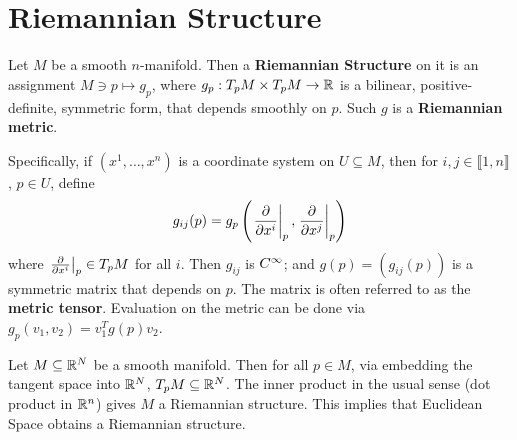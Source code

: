 \documentclass{article}
\begin{document}

\tableofcontents
\newpage

\section{Riemannian Structure}

\begin{definition}
    Let $M$ be a smooth $n$-manifold. Then a \textbf{Riemannian Structure} on it is an assignment $M \ni p \mapsto g_p$, where $g_p: T_p M \times T_p M \to \mathbb{R}$ is a bilinear, positive-definite, symmetric form, that depends smoothly on $p$. Such $g$ is a \textbf{Riemannian metric}. 
    
    Specifically, if $(x^1, \dots, x^n)$ is a coordinate system on $U \subseteq M$, then for $i, j \in \llbracket 1, n \rrbracket$, $p \in U$, define
    \[
        g_{ij}(p) = g_p\left(\left.\frac{\partial }{\partial x^i}\right|_{p}, \left.\frac{\partial }{\partial x^j}\right|_{p}\right)
    \]
    where $\left.\frac{\partial }{\partial x^i}\right|_{p} \in T_p M$ for all $i$. Then $g_{ij}$ is $C^{\infty}$; and $g(p) = (g_{ij}(p))$ is a symmetric matrix that depends on $p$. The matrix is often referred to as the \textbf{metric tensor}. Evaluation on the metric can be done via $g_p(v_1, v_2) = v_1^T g(p) v_2$.
\end{definition}

\begin{example}
    Let $M \subseteq \mathbb{R}^N$ be a smooth manifold. Then for all $p \in M$, via embedding the tangent space into $\mathbb{R}^N$, $T_p M \subseteq \mathbb{R}^N$. The inner product in the usual sense (dot product in $\mathbb{R}^n$) gives $M$ a Riemannian structure. This implies that Euclidean Space obtains a Riemannian structure. 
\end{example}
\end{document}
